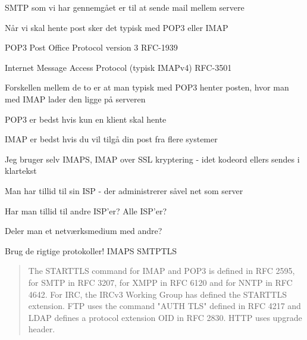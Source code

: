 \documentclass[Screen16to9,17pt]{foils}
\begin{document}
\begin{list1}
\item SMTP som vi har gennemgået er til at sende mail mellem servere
\item Når vi skal hente post sker det typisk med POP3 eller IMAP
\begin{list2}
\item POP3 Post Office Protocol version 3 RFC-1939
\item Internet Message Access Protocol (typisk IMAPv4) RFC-3501
\end{list2}
\item Forskellen mellem de to er at man typisk med POP3 henter posten, hvor man med IMAP lader den ligge på serveren
\item POP3 er bedst hvis kun en klient skal hente
\item IMAP er bedst hvis du vil tilgå din post fra flere systemer
\item Jeg bruger selv IMAPS, IMAP over SSL kryptering - idet kodeord ellers sendes i klartekst
\end{list1}




\begin{list1}
\item Man har tillid til sin ISP - der administrerer såvel net som server
\end{list1}


\begin{list1}
\item Har man tillid til andre ISP'er? Alle ISP'er?
\item Deler man et netværksmedium med andre?
\item {\color{security6blue}Brug de rigtige protokoller!} IMAPS SMTPTLS
\end{list1}



\begin{quote}
The STARTTLS command for IMAP and POP3 is defined in RFC 2595, for SMTP in RFC 3207, for XMPP in RFC 6120 and for NNTP in RFC 4642. For IRC, the IRCv3 Working Group has defined the STARTTLS extension. FTP uses the command "AUTH TLS" defined in RFC 4217 and LDAP defines a protocol extension OID in RFC 2830. HTTP uses upgrade header.
\end{quote}
\end{document}
